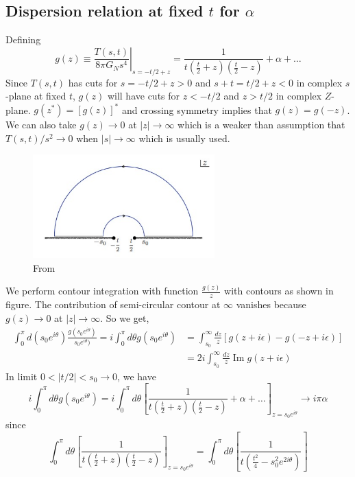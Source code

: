﻿\documentclass[12pt,a4paper]{article}
\begin{document}
\subsection{Dispersion relation at fixed $t$ for $\alpha$}
Defining 
$$
\left.g(z) \equiv \frac{T(s, t)}{8 \pi G_{N} s^{4}}\right|_{s=-t / 2+z}=\frac{1}{t\left(\frac{t}{2}+z\right)\left(\frac{t}{2}-z\right)}+\alpha+\ldots
$$
Since $T(s,t)$ has cuts for $s=-t/2+z>0$ and $s+t=t/2 +z<0$ in complex $s$-plane at fixed $t$, $g(z)$ will have cuts for $z<-t/2$ and $z>t/2$ in complex $Z$-plane. $g\left(z^{*}\right)=[g(z)]^{*}$ and crossing symmetry implies that $g(z)=g(-z)$. We can also take $g(z)\rightarrow 0$ at $|z|\rightarrow \infty$ which is a weaker than assumption that $T(s, t) / s^{2} \rightarrow 0$ when $|s| \rightarrow \infty$ which is usually used.
\begin{figure}[H]
  \centering
  \includegraphics[width=7cm]{15.jpg}
  \caption{From \cite{8}}
  \label{fig:1}
\end{figure}
We perform contour integration with function $\frac{g(z)}{z}$ with contours as shown in figure. The contribution of semi-circular contour at $\infty$ vanishes because $g(z)\rightarrow 0$ at $|z|\rightarrow \infty$. So we get,
$$
\begin{aligned}
\int_{0}^{\pi} d (s_{0} e^{i \theta}) \frac{g(s_{0} e^{i \theta})}{s_{0} e^{i \theta})} = i \int_{0}^{\pi} d \theta g(s_{0} e^{i \theta}) &=\int_{s_{0}}^{\infty} \frac{d z}{z}[g(z+i \epsilon)-g(-z+i \epsilon)] \\ &=2 i \int_{s_{0}}^{\infty} \frac{d z}{z} \operatorname{Im} g(z+i \epsilon) 
\end{aligned}
$$
In limit $0<|t/2|<s_{0} \rightarrow 0$, we have
$$
i \int_{0}^{\pi} d \theta g(s_{0} e^{i \theta})=i \int_{0}^{\pi} d \theta\left[\frac{1}{t\left(\frac{t}{2}+z\right)\left(\frac{t}{2}-z\right)}+\alpha+\ldots\right]_{z=s_{0} e^{i \theta}} \rightarrow i \pi \alpha
$$
since 
$$
\int_{0}^{\pi} d \theta\left[\frac{1}{t\left(\frac{t}{2}+z\right)\left(\frac{t}{2}-z\right)}\right]_{z=s_{0} e^{i \theta}} =\int_{0}^{\pi} d \theta\left[\frac{1}{t\left(\frac{t^{2}}{4}-s_{0}^{2} e^{2i \theta}\right)}\right]
$$
\end{document}
